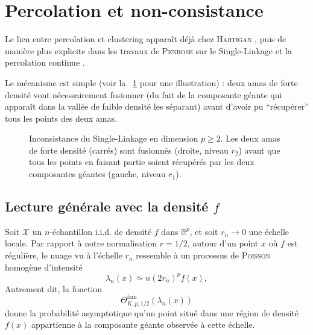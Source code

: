 \section{Percolation et non-consistance}

Le lien entre percolation et clustering apparaît déjà chez \textsc{Hartigan} \cite{hartigan81}, puis de manière plus explicite dans les travaux de \textsc{Penrose} sur le Single-Linkage et la percolation continue \cite{Penrose1995, penrose2003}. 

Le mécanisme est simple (voir la \Fig~\ref{fig:percolation_2_carres} pour une illustration) : deux amas de forte densité vont nécessairement fusionner (du fait de la composante géante qui apparaît dans la vallée de faible densité les séparant) avant d'avoir pu ``récupérer'' tous les points des deux amas.

\begin{figure}[!ht]
  \centering
  \caption{Inconsistance du Single-Linkage en dimension $p\ge2$. Les deux amas de forte densité (carrés) sont fusionnés (droite, niveau $r_2$) avant que tous les points en faisant partie soient récupérés par les deux composantes géantes (gauche, niveau $r_1$).\label{fig:percolation_2_carres}}
\end{figure}

\subsection{Lecture générale avec la densité $f$}

Soit $\mathcal X$ un $n$-échantillon i.i.d. de densité $f$ dans $\mathbb R^p$, et soit $r_n\to0$ une échelle locale. Par rapport à notre normalisation $r=1/2$, autour d'un point $x$ où $f$ est régulière, le nuage vu à l'échelle $r_n$ ressemble à un processus de \textsc{Poisson} homogène d'intensité
\[
    \lambda_n(x) \simeq n(2r_n)^p f(x),
\]
Autrement dit, la fonction
\[
    \Theta^{\mathrm{fam}}_{K,p,1/2}(\lambda_n(x))
\]
donne la probabilité asymptotique qu'un point situé dans une région de densité $f(x)$ appartienne à la composante géante observée à cette échelle.

